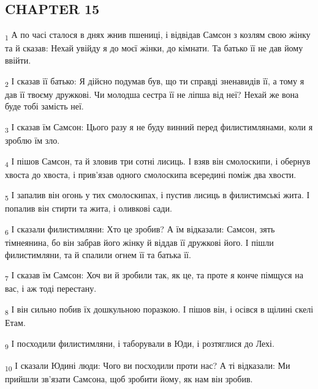 \subsection{CHAPTER 15}
\begin{tcolorbox}
\textsubscript{1} А по часі сталося в днях жнив пшениці, і відвідав Самсон з козлям свою жінку та й сказав: Нехай увійду я до моєї жінки, до кімнати. Та батько її не дав йому ввійти.
\end{tcolorbox}
\begin{tcolorbox}
\textsubscript{2} І сказав її батько: Я дійсно подумав був, що ти справді зненавидів її, а тому я дав її твоєму дружкові. Чи молодша сестра її не ліпша від неї? Нехай же вона буде тобі замість неї.
\end{tcolorbox}
\begin{tcolorbox}
\textsubscript{3} І сказав їм Самсон: Цього разу я не буду винний перед филистимлянами, коли я зроблю їм зло.
\end{tcolorbox}
\begin{tcolorbox}
\textsubscript{4} І пішов Самсон, та й зловив три сотні лисиць. І взяв він смолоскипи, і обернув хвоста до хвоста, і прив'язав одного смолоскипа всередині поміж два хвости.
\end{tcolorbox}
\begin{tcolorbox}
\textsubscript{5} І запалив він огонь у тих смолоскипах, і пустив лисиць в филистимські жита. І попалив він стирти та жита, і оливкові сади.
\end{tcolorbox}
\begin{tcolorbox}
\textsubscript{6} І сказали филистимляни: Хто це зробив? А їм відказали: Самсон, зять тімнеянина, бо він забрав його жінку й віддав її дружкові його. І пішли филистимляни, та й спалили огнем її та батька її.
\end{tcolorbox}
\begin{tcolorbox}
\textsubscript{7} І сказав їм Самсон: Хоч ви й зробили так, як це, та проте я конче пімщуся на вас, і аж тоді перестану.
\end{tcolorbox}
\begin{tcolorbox}
\textsubscript{8} І він сильно побив їх дошкульною поразкою. І пішов він, і осівся в щілині скелі Етам.
\end{tcolorbox}
\begin{tcolorbox}
\textsubscript{9} І посходили филистимляни, і таборували в Юди, і розтяглися до Лехі.
\end{tcolorbox}
\begin{tcolorbox}
\textsubscript{10} І сказали Юдині люди: Чого ви посходили проти нас? А ті відказали: Ми прийшли зв'язати Самсона, щоб зробити йому, як нам він зробив.
\end{tcolorbox}
